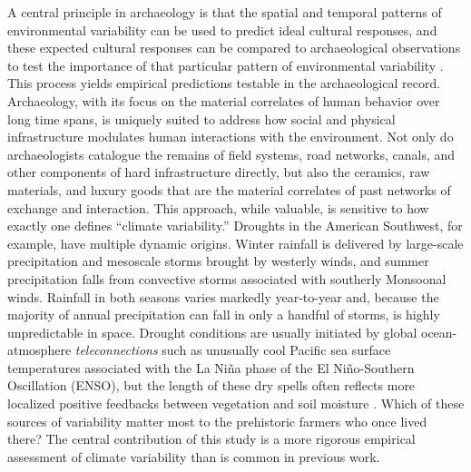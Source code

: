 \documentclass[11pt]{wlscirep}
\begin{document}
A central principle in archaeology is that the spatial and temporal patterns of environmental variability can be used to predict ideal cultural responses, and these expected cultural responses can be compared to archaeological observations to test the importance of that particular pattern of environmental variability \cite{halstead1989}. This process yields empirical predictions testable in the archaeological record. Archaeology, with its focus on the material correlates of human behavior over long time spans, is uniquely suited to address how social and physical infrastructure modulates human interactions with the environment. Not only do archaeologists catalogue the remains of field systems, road networks, canals, and other components of hard infrastructure directly, but also the ceramics, raw materials, and luxury goods that are the material correlates of past networks of exchange and interaction. This approach, while valuable, is sensitive to how exactly one defines ``climate variability.'' Droughts in the American Southwest, for example, have multiple dynamic origins. Winter rainfall is delivered by large-scale precipitation and mesoscale storms brought by westerly winds, and summer precipitation falls from convective storms associated with southerly Monsoonal winds. Rainfall in both seasons varies markedly year-to-year and, because the majority of annual precipitation can fall in only a handful of storms, is highly unpredictable in space. Drought conditions are usually initiated by global ocean-atmosphere \textit{teleconnections} such as unusually cool Pacific sea surface temperatures associated with the La Ni\~{n}a phase of the El Ni\~{n}o-Southern Oscillation (ENSO), but the length of these dry spells often reflects more localized positive feedbacks between vegetation and soil moisture \cite{Koster2004RegionsPrecipitation,Ault2014AssessingData}. Which of these sources of variability matter most to the prehistoric farmers who once lived there? The central contribution of this study is a more rigorous empirical assessment of climate variability than is common in previous work.
\end{document}
